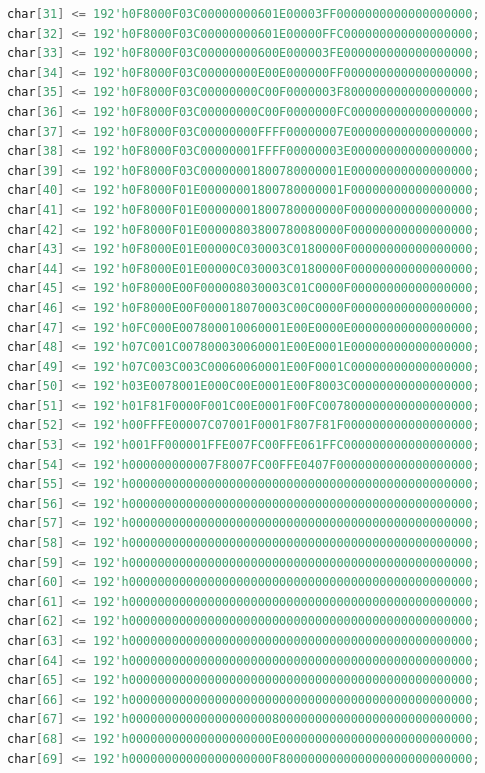 \documentclass[UTF8]{article}
\theoremstyle{MyLineTheoremStyle} %
\theoremstyle{MyBlockTheoremStyle} %
\theoremstyle{MySubsubsectionStyle} %
\begin{document}
\begin{lstlisting}[language=Verilog, caption={小组成员姓名显示Verilog代码修改部分}, label={lst:verilog_code2}]
char[31] <= 192'h0F8000F03C00000000601E00003FF0000000000000000000;
char[32] <= 192'h0F8000F03C00000000601E00000FFC000000000000000000;
char[33] <= 192'h0F8000F03C00000000600E000003FE000000000000000000;
char[34] <= 192'h0F8000F03C00000000E00E000000FF000000000000000000;
char[35] <= 192'h0F8000F03C00000000C00F0000003F800000000000000000;
char[36] <= 192'h0F8000F03C00000000C00F0000000FC00000000000000000;
char[37] <= 192'h0F8000F03C00000000FFFF00000007E00000000000000000;
char[38] <= 192'h0F8000F03C00000001FFFF00000003E00000000000000000;
char[39] <= 192'h0F8000F03C00000001800780000001E00000000000000000;
char[40] <= 192'h0F8000F01E00000001800780000001F00000000000000000;
char[41] <= 192'h0F8000F01E00000001800780000000F00000000000000000;
char[42] <= 192'h0F8000F01E00000803800780080000F00000000000000000;
char[43] <= 192'h0F8000E01E00000C030003C0180000F00000000000000000;
char[44] <= 192'h0F8000E01E00000C030003C0180000F00000000000000000;
char[45] <= 192'h0F8000E00F000008030003C01C0000F00000000000000000;
char[46] <= 192'h0F8000E00F000018070003C00C0000F00000000000000000;
char[47] <= 192'h0FC000E007800010060001E00E0000E00000000000000000;
char[48] <= 192'h07C001C007800030060001E00E0001E00000000000000000;
char[49] <= 192'h07C003C003C00060060001E00F0001C00000000000000000;
char[50] <= 192'h03E0078001E000C00E0001E00F8003C00000000000000000;
char[51] <= 192'h01F81F0000F001C00E0001F00FC007800000000000000000;
char[52] <= 192'h00FFFE00007C07001F0001F807F81F000000000000000000;
char[53] <= 192'h001FF000001FFE007FC00FFE061FFC000000000000000000;
char[54] <= 192'h000000000007F8007FC00FFE0407F0000000000000000000;
char[55] <= 192'h000000000000000000000000000000000000000000000000;
char[56] <= 192'h000000000000000000000000000000000000000000000000;
char[57] <= 192'h000000000000000000000000000000000000000000000000;
char[58] <= 192'h000000000000000000000000000000000000000000000000;
char[59] <= 192'h000000000000000000000000000000000000000000000000;
char[60] <= 192'h000000000000000000000000000000000000000000000000;
char[61] <= 192'h000000000000000000000000000000000000000000000000;
char[62] <= 192'h000000000000000000000000000000000000000000000000;
char[63] <= 192'h000000000000000000000000000000000000000000000000;
char[64] <= 192'h000000000000000000000000000000000000000000000000;
char[65] <= 192'h000000000000000000000000000000000000000000000000;
char[66] <= 192'h000000000000000000000000000000000000000000000000;
char[67] <= 192'h000000000000000000008000000000000000000000000000;
char[68] <= 192'h00000000000000000000E000000000000000000000000000;
char[69] <= 192'h00000000000000000000F800000000000000000000000000;

\end{lstlisting}
\end{document}
